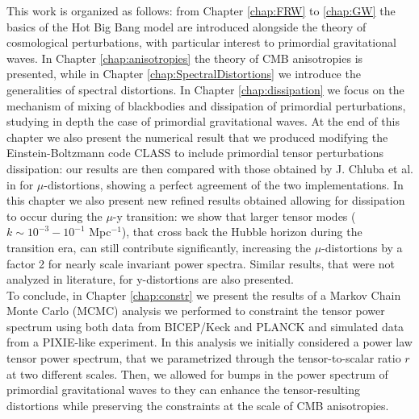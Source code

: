 This work is organized as follows: from Chapter \ref{chap:FRW} to \ref{chap:GW} the basics of the Hot Big Bang model are introduced alongside the theory of cosmological perturbations, with particular interest to primordial gravitational waves. In Chapter \ref{chap:anisotropies} the theory of CMB anisotropies is presented, while in Chapter \ref{chap:SpectralDistortions} we introduce the generalities of spectral distortions. In Chapter \ref{chap:dissipation} we focus on the mechanism of mixing of blackbodies and dissipation of primordial perturbations, studying in depth the case of primordial gravitational waves. At the end of this chapter we also present the numerical result that we produced modifying the Einstein-Boltzmann code CLASS \cite{CLASS} to include primordial tensor perturbations dissipation: our results are then compared with those obtained by J. Chluba et al. in \cite{Chluba_tens_diss} for $\mu$-distortions, showing a perfect agreement of the two implementations. In this chapter we also present new refined results obtained allowing for dissipation to occur during the $\mu$-y transition: we show that larger tensor modes ($k\sim 10^{-3}-10^{-1}$ Mpc$^{-1}$), that cross back the Hubble horizon during the transition era, can still contribute significantly, increasing the $\mu$-distortions by a factor 2 for nearly scale invariant power spectra. Similar results, that were not analyzed in literature, for y-distortions are also presented.\\
To conclude, in Chapter \ref{chap:constr} we present the results of a Markov Chain Monte Carlo (MCMC) analysis we performed to constraint the tensor power spectrum using both data from BICEP/Keck \cite{Ade_2021} and PLANCK \cite{planck2018results} and simulated data from a PIXIE-like experiment. In this analysis we initially considered a power law tensor power spectrum, that we parametrized through the tensor-to-scalar ratio $r$ at two different scales. Then, we allowed for bumps in the power spectrum of primordial gravitational waves to they can enhance the tensor-resulting distortions while preserving the constraints at the scale of CMB anisotropies.    